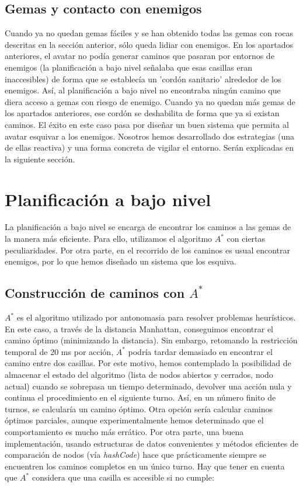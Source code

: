 \subsection{Gemas y contacto con enemigos}

Cuando ya no quedan gemas fáciles y se han obtenido todas las gemas con rocas descritas en la sección anterior, sólo queda lidiar con enemigos. En los apartados anteriores, el avatar no podía generar caminos que pasaran por entornos de enemigos (la planificación a bajo nivel señalaba que esas casillas eran inaccesibles) de forma que se establecía un 'cordón sanitario' alrededor de los enemigos. Así, al planificación a bajo nivel no encontraba ningún camino que diera acceso a gemas con riesgo de enemigo. Cuando ya no quedan más gemas de los apartados anteriores, ese cordón se deshabilita de forma que ya si existan caminos. El éxito en este caso pasa por diseñar un buen sistema que permita al avatar esquivar a los enemigos. Nosotros hemos desarrollado dos estrategias (una de ellas reactiva) y una forma concreta de vigilar el entorno. Serán explicadas en la siguiente sección.

\section{Planificación a bajo nivel}

La planificación a bajo nivel se encarga de encontrar los caminos a las gemas de la manera más eficiente. Para ello, utilizamos el algoritmo $A^*$ con ciertas peculiaridades. Por otra parte, en el recorrido de los caminos es usual encontrar enemigos, por lo que hemos diseñado un sistema que los esquiva.

\subsection{Construcción de caminos con $A^*$}

$A^*$ es el algoritmo utilizado por antonomasia para resolver problemas heurísticos. En este caso, a través de la distancia Manhattan, conseguimos encontrar el camino óptimo (minimizando la distancia). Sin embargo, retomando la restricción temporal de 20 ms por acción, $A^*$ podría tardar demasiado en encontrar el camino entre dos casillas. Por este motivo, hemos contemplado la posibilidad de almacenar el estado del algoritmo (lista de nodos abiertos y cerrados, nodo actual) cuando se sobrepasa un tiempo determinado, devolver una acción nula y continua el procedimiento en el siguiente turno. Así, en un número finito de turnos, se calcularía un camino óptimo. Otra opción sería calcular caminos óptimos parciales, aunque experimentalmente hemos determinado que el comportamiento es mucho más errático. Por otra parte, una buena implementación, usando estructuras de datos convenientes y métodos eficientes de comparación de nodos (vía \textit{hashCode}) hace que prácticamente siempre se encuentren los caminos completos en un único turno. Hay que tener en cuenta que $A^*$ considera que una casilla es accesible si no cumple:

